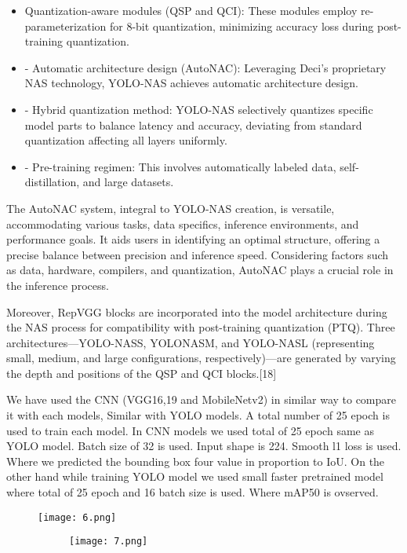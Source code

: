 \documentclass[conference]{IEEEtran}
\begin{document}
\begin{itemize}
\item Quantization-aware modules (QSP and QCI): These modules employ re-parameterization for 8-bit quantization, minimizing accuracy loss
during post-training quantization. 
\item -	Automatic architecture design (AutoNAC): Leveraging Deci's proprietary NAS technology, YOLO-NAS achieves automatic architecture design. 
\item -	Hybrid quantization method: YOLO-NAS selectively quantizes specific model parts to balance latency and accuracy, deviating from standard quantization affecting all layers uniformly. 
\item -	Pre-training regimen: This involves automatically labeled data, self-distillation, and large datasets. 
\end{itemize}
The AutoNAC system, integral to YOLO-NAS creation, is versatile, accommodating various tasks, data specifics, inference environments, and performance goals. It aids users in identifying an optimal structure, offering a precise balance between precision and inference speed. Considering factors such as data, hardware, compilers, and quantization, AutoNAC plays a crucial role in the inference process. 

Moreover, RepVGG blocks are incorporated into the model architecture during the NAS process for compatibility with post-training quantization (PTQ). Three architectures—YOLO-NASS, YOLONASM, and YOLO-NASL (representing small, medium, and large configurations, respectively)—are generated by varying the depth and positions of the QSP and QCI blocks.[18] 

We have used the CNN (VGG16,19 and MobileNetv2) in similar way to compare it with each models, Similar with YOLO models. A total number of 25 epoch is used to train each model. In CNN models we used total of 25 epoch same as YOLO model. Batch size of 32 is used. Input shape is 224. Smooth l1 loss is used. Where we predicted the bounding box four value in proportion to IoU. On the other hand while training YOLO model we used small faster pretrained model where total of 25 epoch and 16 batch size is used. Where mAP50 is ovserved. 
\begin{figure}
    \centering
    \texttt{[image: 6.png]}
\begin{figure}
    \centering
    \texttt{[image: 7.png]} 
\end{figure}
    
\end{figure}
\end{document}
